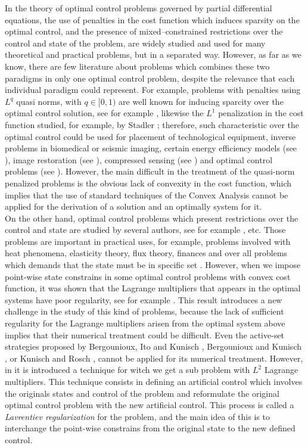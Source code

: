 \documentclass[11pt,a4paper]{amsart}
\begin{document}
In the theory of optimal control problems governed by partial differential equations, the use of penalties in the cost function which induces sparsity on the optimal control, and the presence of mixed--constrained restrictions over the control and state of the problem, are widely studied and used for many theoretical and practical problems, but in a separated way. However, as far as we know, there are few literature about problems which combines these two paradigms in only one optimal control problem, despite the relevance that each individual paradigm could represent. For example, problems with penalties using $L^q$ quasi norms, with $q\in [0,1)$ are well known for inducing sparcity over the optimal control solution, see for example \cite{ito-kunish, merino}, likewise the $L^1$ penalization in the cost function studied, for example, by Stadler \cite{stadler}; therefore, such characteristic over the optimal control could be used for placement of technological equipment, inverse problems in biomedical or seismic imaging, certain energy efficiency models (see \cite{vogel}), image restoration (see \cite{hinttv}), compressed sensing (see \cite{donoho}) and optimal control problems (see \cite{casas}). However, the main difficult in the treatment of the quasi-norm penalized problems is the obvious lack of convexity in the cost function, which implies that the use of standard techniques of the Convex Analysis cannot be applied for the derivation of a solution and an optimally system for it.\\ 

On the other hand, optimal control problems which present restrictions over the control and state are studied by several authors, see for example \cite{casas, casas-kunisch, casas-delosreyes}, etc. Those problems are important in practical uses, for example, problems involved with heat phenomena, elasticity theory, flux theory, finances and over all problems which demands that the state must be in specific set \cite{hintkun}. However, when we impose point-wise state constrains in some optimal control problems with convex cost function, it was shown that the Lagrange multipliers that appears in the optimal systems have poor regularity, see for example \cite{casas, casas-delosreyes}. This result introduces a new challenge in the study of this kind of problems, because the lack of sufficient regularity for the Lagrange multipliers arisen from the optimal system above implies that their numerical treatment could be difficult. Even the active-set strategies proposed by Bergounioux, Ito and Kunisch \cite{bik}, Bergounioux and Kunisch \cite{bk}, or Kunisch and Rosch \cite{kr}, cannot be applied for its numerical treatment. However, in \cite{meyer1} it is introduced a technique for witch we get a sub problem with $L^2$ Lagrange multipliers. This technique consists in defining an artificial control which involves the originals states and control of the problem and reformulate the original optimal control problem with the new artificial control. This process is called a \textit{Lavrentiev regularization} for the problem, and the main idea of this is to interchange the point-wise constrains from the original state to the new defined control.\\
\end{document}
